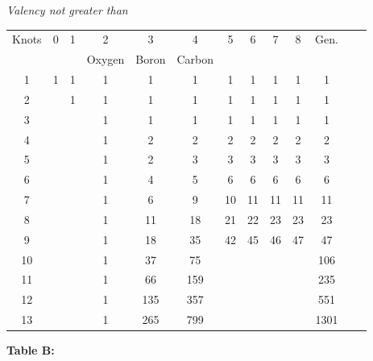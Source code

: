 \documentclass[11pt,a4paper]{book}
\begin{document}
\begin{small}
\begin{center}
\textit{Valency not greater than}
\end{center}
\begin{center}
\begin{tabular}{|c|c|cc|cc|cccccc|c|}
\hline
Knots & 0 & 1 & 2 & 3 & 4 & 5 & 6 & 7 & 8 & Gen. \\
      &   &   & Oxygen & Boron & Carbon & & & & & \\
\hline
1  & 1 & 1 & 1 & 1 & 1 & 1 & 1 & 1 & 1 & 1 \\
2  &   & 1 & 1 & 1 & 1 & 1 & 1 & 1 & 1 & 1 \\
3  &   &   & 1 & 1 & 1 & 1 & 1 & 1 & 1 & 1 \\
4  &   &   & 1 & 2 & 2 & 2 & 2 & 2 & 2 & 2 \\
5  &   &   & 1 & 2 & 3 & 3 & 3 & 3 & 3 & 3 \\
6  &   &   & 1 & 4 & 5 & 6 & 6 & 6 & 6 & 6 \\
7  &   &   & 1 & 6 & 9 & 10 & 11 & 11 & 11 & 11 \\
8  &   &   & 1 & 11 & 18 & 21 & 22 & 23 & 23 & 23 \\
9  &   &   & 1 & 18 & 35 & 42 & 45 & 46 & 47 & 47 \\
10 &   &   & 1 & 37 & 75 & & & & & 106 \\
11 &   &   & 1 & 66 & 159 & & & & & 235 \\
12 &   &   & 1 & 135 & 357 & & & & & 551 \\
13 &   &   & 1 & 265 & 799 & & & & & 1301 \\
\hline
\end{tabular}
\end{center}
\end{small}

\begin{center}
\textbf{Table B:}
\end{center}
\end{document}
